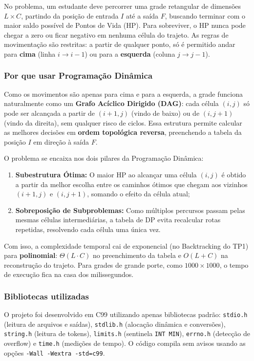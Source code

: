 \documentclass[12pt,a4paper]{article}
\makeatletter
\DeclareRobustCommand{\_}{%
  \ifmmode
    \nfss@text{\textunderscore}%
  \else
    \textunderscore\allowbreak
  \fi
}
\makeatother
\begin{document}
No problema, um estudante deve percorrer uma grade retangular de dimensões $L \times C$, partindo da posição de entrada $I$ até a saída $F$, buscando terminar com o maior saldo possível de Pontos de Vida (HP). Para sobreviver, o HP nunca pode chegar a zero ou ficar negativo em nenhuma célula do trajeto. As regras de movimentação são restritas: a partir de qualquer ponto, só é permitido andar para \textbf{cima} (linha $i \to i-1$) ou para a \textbf{esquerda} (coluna $j \to j-1$).

\subsubsection*{Por que usar Programação Dinâmica}

Como os movimentos são apenas para cima e para a esquerda, a grade funciona naturalmente como um \textbf{Grafo Acíclico Dirigido (DAG)}: cada célula $(i,j)$ só pode ser alcançada a partir de $(i+1,j)$ (vindo de baixo) ou de $(i,j+1)$ (vindo da direita), sem qualquer risco de ciclos. Essa estrutura permite calcular as melhores decisões em \textbf{ordem topológica reversa}, preenchendo a tabela da posição $I$ em direção à saída $F$.

O problema se encaixa nos dois pilares da Programação Dinâmica:
\begin{enumerate}
    \item \textbf{Subestrutura Ótima:} O maior HP ao alcançar uma célula $(i,j)$ é obtido a partir da melhor escolha entre os caminhos ótimos que chegam aos vizinhos $(i+1,j)$ e $(i,j+1)$, somando o efeito da célula atual;
    \item \textbf{Sobreposição de Subproblemas:} Como múltiplos percursos passam pelas mesmas células intermediárias, a tabela de DP evita recalcular rotas repetidas, resolvendo cada célula uma única vez.
\end{enumerate}

Com isso, a complexidade temporal cai de exponencial (no Backtracking do TP1) para \textbf{polinomial}: $\Theta(L \cdot C)$ no preenchimento da tabela e $O(L + C)$ na reconstrução do trajeto. Para grades de grande porte, como $1000 \times 1000$, o tempo de execução fica na casa dos milissegundos.

\subsubsection*{Bibliotecas utilizadas}

O projeto foi desenvolvido em C99 utilizando apenas bibliotecas padrão: \texttt{stdio.h} (leitura de arquivos e saídas), \texttt{stdlib.h} (alocação dinâmica e conversões), \texttt{string.h} (leitura de tokens), \texttt{limits.h} (sentinela \texttt{INT\_MIN}), \texttt{errno.h} (detecção de overflow) e \texttt{time.h} (medições de tempo). O código compila sem avisos usando as opções \texttt{-Wall -Wextra -std=c99}.
\end{document}

